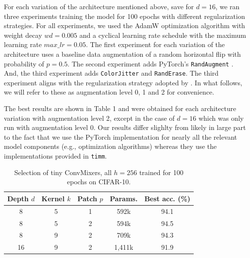\documentclass[letterpaper]{article} %
\begin{document}
For each variation of the architecture mentioned above, save for $d=16$, we ran three experiments training the model for 100 epochs with different regularization strategies. For all experiments, we used the AdamW optimization algorithm \citep{Loshchilov2017} with weight decay $wd=0.005$ and a cyclical learning rate schedule \citep{Smith2017} with the maximum learning rate $max\_lr=0.05$. The first experiment for each variation of the architecture uses a baseline data augmentation of a random horizontal flip with probability of $p=0.5$. The second experiment adds PyTorch's \verb|RandAugment| \citep{Cubuk2019}. And, the third experiment adds \verb|ColorJitter| and \verb|RandErase|\citep{Zhong2017}. The third experiment aligns with the regularization strategy adopted by \citet{trockman2022patches}. In what follows, we will refer to these as augmentation level 0, 1 and 2 for convenience.

The best results are shown in Table 1 and were obtained for each architecture variation with augmentation level 2, except in the case of $d=16$ which was only run with augmentation level 0. Our results differ slighlty from \citet{trockman2022patches} likely in large part to the fact that we use the PyTorch implementation for nearly all the relevant model components (e.g., optimization algorithms) whereas they use the implementations provided in \verb|timm|.

\begin{table}
    \begin{tabular}{|c|c|c|c|c|}
        \hline
        \hline 
        Depth $d$& Kernel $k$& Patch $p$& Params. & Best acc. (\%) \\
        \hline
        8 & 5 & 1 & 592k & 94.1 \\
        8 & 5 & 2 & 594k & 94.5 \\
        8 & 9 & 2 & 709k & 94.3 \\
        16 & 9 & 2 & 1,411k & 91.9 \\
        \hline
    \end{tabular}
    \caption{Selection of tiny ConvMixers, all $h=256$ trained for 100 epochs on CIFAR-10.}
\end{table}
\end{document}

